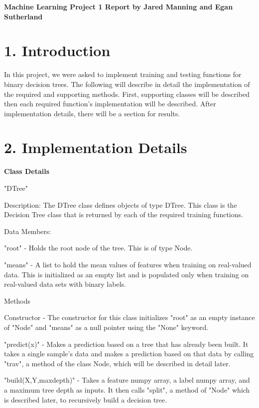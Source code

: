 \documentclass{article}
\begin{document}
\thispagestyle{empty}
\begin{center}
\large\bf Machine Learning Project 1 Report by Jared Manning and Egan Sutherland
\end{center}
\bigskip


\section*{1. Introduction}

\noindent In this project, we were asked to implement training and testing functions for binary decision trees. The following will describe in detail the implementation of the required and supporting methods. First, supporting classes will be described then each required function's implementation will be described. After implementation details, there will be a section for results.

\section*{2. Implementation Details}

\noindent \textbf{Class Details}

\noindent "DTree"

\indent Description: The DTree class defines objects of type DTree. This class is the Decision Tree class that is returned by each of the required training functions.

\indent Data Members:

\indent \textbullet "root" - Holds the root node of the tree. This is of type Node.

\indent \textbullet "means" - A list to hold the mean values of features when training on real-valued data. This is initialized as an empty list and is populated only when training on real-valued data sets with binary labels.

\indent Methods

\indent \textbullet Constructor - The constructor for this class initializes "root" as an empty instance of "Node" and "means" as a null pointer using the "None" keyword.

\indent \textbullet "predict(x)" - Makes a prediction based on a tree that has already been built. It takes a single sample's data and makes a prediction based on that data by calling "trav", a method of the class Node, which will be described in detail later.

\indent \textbullet "build(X,Y,max\textunderscore depth)" - Takes a feature numpy array, a label numpy array, and a maximum tree depth as inputs. It then calls "split", a method of "Node" which is described later, to recursively build a decision tree. 
\end{document}
